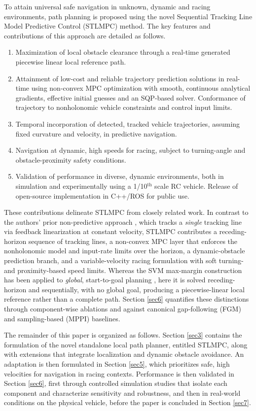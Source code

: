 \documentclass[journal]{IEEEtran}
\begin{document}
To attain universal safe navigation in unknown, dynamic and racing environments, path planning is proposed using the novel Sequential Tracking Line Model Predictive Control (STLMPC) method. The key features and contributions of this approach are detailed as follows.
\begin{enumerate}
\item{Maximization of local obstacle clearance through a real-time generated piecewise linear local reference path.}
\item{Attainment of low-cost and reliable trajectory prediction solutions in real-time using non-convex MPC optimization with smooth, continuous analytical gradients, effective initial guesses and an SQP-based solver. Conformance of trajectory to nonholonomic vehicle constraints and control input limits.}
\item{Temporal incorporation of detected, tracked vehicle trajectories, assuming fixed curvature and velocity, in predictive navigation.}
\item{Navigation at dynamic, high speeds for racing, subject to turning-angle and obstacle-proximity safety conditions.}
\item{Validation of performance in diverse, dynamic environments, both in simulation and experimentally using a 1/10$^{\text{th}}$ scale RC vehicle. Release of open-source implementation in C++/ROS for public use.}
\end{enumerate}

These contributions delineate STLMPC from closely related work. In contrast to the authors' prior non-predictive approach \cite{PD}, which tracks a \emph{single} tracking line via feedback linearization at constant velocity, STLMPC contributes a receding-horizon sequence of tracking lines, a non-convex MPC layer that enforces the nonholonomic model and input-rate limits over the horizon, a dynamic-obstacle prediction branch, and a variable-velocity racing formulation with soft turning- and proximity-based speed limits. Whereas the SVM max-margin construction has been applied to \emph{global}, start-to-goal planning \cite{Miura2006,Morales2016}, here it is solved receding-horizon and sequentially, with no global goal, producing a piecewise-linear local reference rather than a complete path. Section \ref{sec6} quantifies these distinctions through component-wise ablations and against canonical gap-following (FGM) and sampling-based (MPPI) baselines.

The remainder of this paper is organized as follows. Section \ref{sec3} contains the formulation of the novel standalone local path planner, entitled STLMPC, along with extensions that integrate localization and dynamic obstacle avoidance. An adaptation is then formulated in Section \ref{sec5}, which prioritizes safe, high velocities for navigation in racing contexts. Performance is then validated in Section \ref{sec6}, first through controlled simulation studies that isolate each component and characterize sensitivity and robustness, and then in real-world conditions on the physical vehicle, before the paper is concluded in Section \ref{sec7}.
\end{document}
